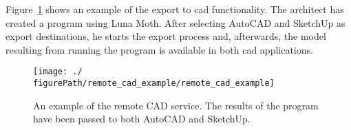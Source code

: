 Figure~\ref{fig:remote:cad:example} shows an example of the export to \gls{cad} functionality.
The architect has created a program using Luna Moth.
After selecting AutoCAD and SketchUp as export destinations, he starts the export process and, afterwards, the model resulting from running the program is available in both \gls{cad} applications.

\begin{figure}
  \centering
  \texttt{[image: ./\\figurePath/remote\_cad\_example/remote\_cad\_example]}
  \caption[An example of the remote CAD service.]{An example of the remote CAD service. The results of the program have been passed to both AutoCAD and SketchUp.}
  \label{fig:remote:cad:example}
\end{figure}
